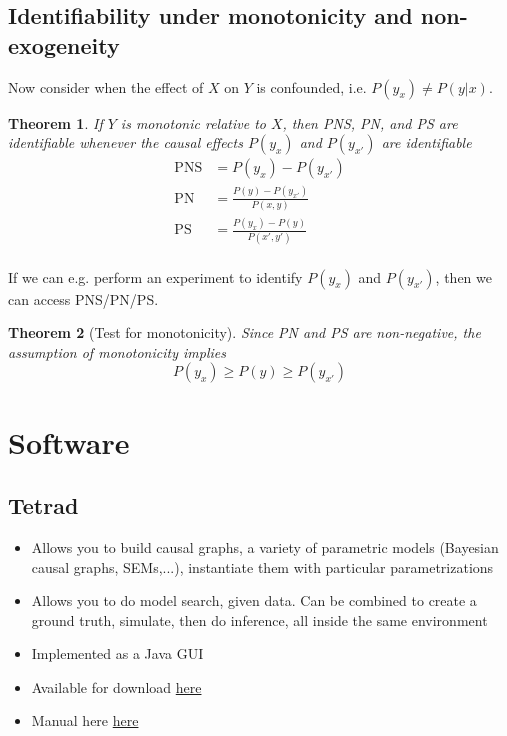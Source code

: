 \documentclass[11pt]{article}
\numberwithin{equation}{section}
\newtheorem{thm}{Theorem}[section]
\begin{document}
\subsection{Identifiability under monotonicity and non-exogeneity}
Now consider when the effect of $X$ on $Y$ is confounded, i.e. $P(y_x)\neq P(y|x)$. 
\begin{thm}
If $Y$ is monotonic relative to $X$, then PNS, PN, and PS are identifiable whenever the causal effects $P(y_x)$ and $P(y_{x'})$ are identifiable
\begin{align}
\text{PNS} &= P(y_x)-P(y_{x'}) \\
\text{PN} &= \frac{P(y)-P(y_{x'})}{P(x,y)} \\
\text{PS} &= \frac{P(y_x)-P(y)}{P(x',y')} \\
\end{align}
\end{thm}
If we can e.g. perform an experiment to identify $P(y_x)$ and $P(y_{x'})$, then we can access PNS/PN/PS.

\begin{thm}[Test for monotonicity]
Since PN and PS are non-negative, the assumption of monotonicity implies
\begin{equation}
P(y_x) \geq P(y) \geq P(y_{x'})
\end{equation}
\end{thm}

\section{Software}

\subsection{Tetrad}
\begin{itemize}[noitemsep]
\item Allows you to build causal graphs, a variety of parametric models (Bayesian causal graphs, SEMs,...), instantiate them with particular parametrizations
\item Allows you to do model search, given data. Can be combined to create a ground truth, simulate, then do inference, all inside the same environment
\item Implemented as a Java GUI
\item Available for download \href{https://www.ccd.pitt.edu/tools/}{here} 
\item Manual here \href{http://cmu-phil.github.io/tetrad/manual/}{here}
\end{itemize}
\end{document}
